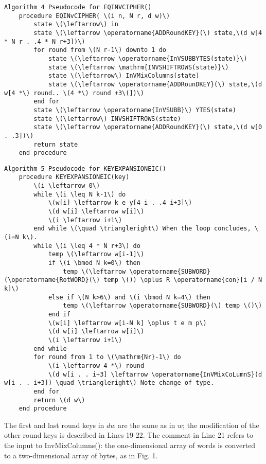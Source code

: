 \begin{verbatim}
Algorithm 4 Pseudocode for EQINVCIPHER()
    procedure EQINvCIPHER( \(i n, N r, d w)\)
        state \(\leftarrow\) in
        state \(\leftarrow \operatorname{ADDRoundKEY}(\) state,\(d w[4 * N r . .4 * N r+3])\)
        for round from \(N r-1\) downto 1 do
            state \(\leftarrow \operatorname{InVSUBBYTES(state)}\)
            state \(\leftarrow \mathrm{INVSHIFTROWS(state)}\)
            state \(\leftarrow\) InVMixColumns(state)
            state \(\leftarrow \operatorname{ADDRounDKEY}(\) state,\(d w[4 *\) round.. \(4 *\) round +3\(])\)
        end for
        state \(\leftarrow \operatorname{InVSUBB}\) YTES(state)
        state \(\leftarrow\) INVSHIFTROWS(state)
        state \(\leftarrow \operatorname{ADDRoundKEY}(\) state,\(d w[0 . .3])\)
        return state
    end procedure
\end{verbatim}

\begin{verbatim}
Algorithm 5 Pseudocode for KEYEXPANSIONEIC()
    procedure KEYEXPANSIONEIC(key)
        \(i \leftarrow 0\)
        while \(i \leq N k-1\) do
            \(w[i] \leftarrow k e y[4 i . .4 i+3]\)
            \(d w[i] \leftarrow w[i]\)
            \(i \leftarrow i+1\)
        end while \(\quad \triangleright\) When the loop concludes, \(i=N k\).
        while \(i \leq 4 * N r+3\) do
            temp \(\leftarrow w[i-1]\)
            if \(i \bmod N k=0\) then
                temp \(\leftarrow \operatorname{SUBWORD}(\operatorname{RotWORD}(\) temp \()) \oplus R \operatorname{con}[i / N k]\)
            else if \(N k>6\) and \(i \bmod N k=4\) then
                temp \(\leftarrow \operatorname{SUBWORD}(\) temp \()\)
            end if
            \(w[i] \leftarrow w[i-N k] \oplus t e m p\)
            \(d w[i] \leftarrow w[i]\)
            \(i \leftarrow i+1\)
        end while
        for round from 1 to \(\mathrm{Nr}-1\) do
            \(i \leftarrow 4 *\) round
            \(d w[i . . i+3] \leftarrow \operatorname{InVMixCoLumnS}(d w[i . . i+3]) \quad \triangleright\) Note change of type.
        end for
        return \(d w\)
    end procedure
\end{verbatim}

The first and last round keys in \(d w\) are the same as in \(w\); the modification of the other round keys is described in Lines 19-22. The comment in Line 21 refers to the input to InvMixColumns(): the one-dimensional array of words is converted to a two-dimensional array of bytes, as in Fig. 1.
